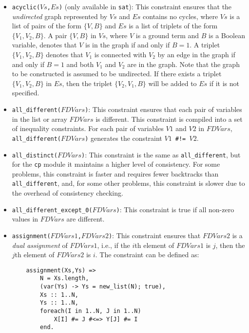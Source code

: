 \begin{itemize}
\item \texttt{acyclic($Vs$,$Es$)} (only available in \texttt{sat}): This constraint ensures that the \textit{undirected} graph represented by $Vs$ and $Es$ contains no cycles, where $Vs$ is a list of pairs of the form $\{V,B\}$ and $Es$ is a list of triplets of the form $\{V_1,V_2,B\}$. A pair $\{V,B\}$ in $Vs$, where $V$ is a ground term and $B$ is a Boolean variable, denotes that $V$ is in the graph if and only if $B = 1$. A triplet $\{V_1,V_2,B\}$ denotes that $V_1$ is connected with $V_2$  by an edge in the graph if and only if $B = 1$ and both $V_1$ and $V_2$ are in the graph. Note that the graph to be constructed is assumed to be undirected. If there exists a triplet $\{V_1,V_2,B\}$ in $Es$, then the triplet $\{V_2,V_1,B\}$ will be added to $Es$ if it is not specified.

\item \texttt{all\_different($FDVars$)}: This constraint ensures that each pair of variables in the list or array $FDVars$ is different. This constraint is compiled into a set of inequality constraints. For each pair of variables $V1$ and $V2$ in $FDVars$, \texttt{all\_different($FDVars$)} generates the constraint {\tt $V1$ \verb+#!=+ $V2$}.

\item \texttt{all\_distinct($FDVars$)}: This constraint is the same as \texttt{all\_different}, but for the \texttt{cp} module it maintains a higher level of consistency. For some problems, this constraint is faster and requires fewer backtracks than \texttt{all\_different}, and, for some other problems, this constraint is slower due to the overhead of consistency checking.

\item \texttt{all\_different\_except\_0($FDVars$)}: This constraint is true if all non-zero values in $FDVars$ are different.
\item \texttt{assignment($FDVars1$,$FDVars2$)}: This constraint ensures that $FDVars2$ is a \emph{dual assignment} of $FDVars1$, i.e., if the $i$th element of $FDVars1$ is $j$, then the $j$th element of $FDVars2$ is $i$. The constraint can be defined as:
\begin{verbatim}
    assignment(Xs,Ys) =>
        N = Xs.length,
        (var(Ys) -> Ys = new_list(N); true),
        Xs :: 1..N,
        Ys :: 1..N,
        foreach(I in 1..N, J in 1..N)
            X[I] #= J #<=> Y[J] #= I
        end.
\end{verbatim}


\end{itemize}
